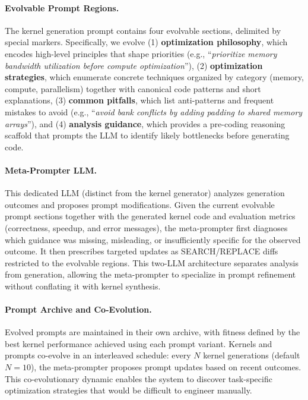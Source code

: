\paragraph{Evolvable Prompt Regions.}
The kernel generation prompt contains four evolvable sections, delimited by special markers. Specifically, we evolve (1) \textbf{optimization philosophy}, which encodes high-level principles that shape priorities (e.g., ``\textit{prioritize memory bandwidth utilization before compute optimization}''), (2) \textbf{optimization strategies}, which enumerate concrete techniques organized by category (memory, compute, parallelism) together with canonical code patterns and short explanations, (3) \textbf{common pitfalls}, which list anti-patterns and frequent mistakes to avoid (e.g., ``\textit{avoid bank conflicts by adding padding to shared memory arrays}''), and (4) \textbf{analysis guidance}, which provides a pre-coding reasoning scaffold that prompts the LLM to identify likely bottlenecks before generating code.


\paragraph{Meta-Prompter LLM.}
This dedicated LLM (distinct from the kernel generator) analyzes generation outcomes and proposes prompt modifications. Given the current evolvable prompt sections together with the generated kernel code and evaluation metrics (correctness, speedup, and error messages), the meta-prompter first diagnoses which guidance was missing, misleading, or insufficiently specific for the observed outcome. It then prescribes targeted updates as SEARCH/REPLACE diffs restricted to the evolvable regions.
This two-LLM architecture separates analysis from generation, allowing the meta-prompter to specialize in prompt refinement without conflating it with kernel synthesis.


\paragraph{Prompt Archive and Co-Evolution.}
Evolved prompts are maintained in their own archive, with fitness defined by the best kernel performance achieved using each prompt variant. 
Kernels and prompts co-evolve in an interleaved schedule: every $N$ kernel generations (default $N=10$), the meta-prompter proposes prompt updates based on recent outcomes. 
This co-evolutionary dynamic enables the system to discover task-specific optimization strategies that would be difficult to engineer manually.


